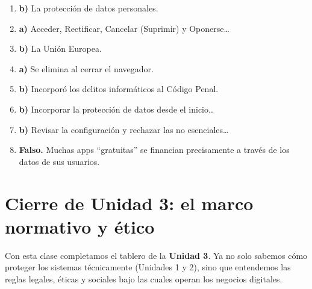 \documentclass[12pt,a4paper]{article}
\newcommand{\checkMark}{\ding{51}}
\begin{document}
\vspace{12pt}
\begin{tcolorbox}[colback=verdeOK!10, colframe=verdeOK,
                  title={\checkMark \; Clave de respuestas}, arc=3mm]
\begin{enumerate}[leftmargin=2em]
  \item \textbf{b)} La protecci\'on de datos personales.
  \item \textbf{a)} Acceder, Rectificar, Cancelar (Suprimir) y Oponerse\ldots
  \item \textbf{b)} La Uni\'on Europea.
  \item \textbf{a)} Se elimina al cerrar el navegador.
  \item \textbf{b)} Incorpor\'o los delitos inform\'aticos al C\'odigo Penal.
  \item \textbf{b)} Incorporar la protecci\'on de datos desde el inicio\ldots
  \item \textbf{b)} Revisar la configuraci\'on y rechazar las no esenciales\ldots
  \item \textbf{Falso.} Muchas apps ``gratuitas'' se financian precisamente a trav\'es de los datos de sus usuarios.
\end{enumerate}
\end{tcolorbox}

\newpage
\section{Cierre de Unidad 3: el marco normativo y \'etico}

Con esta clase completamos el tablero de la \textbf{Unidad 3}. Ya no solo sabemos c\'omo proteger los sistemas t\'ecnicamente (Unidades 1 y 2), sino que entendemos las reglas legales, \'eticas y sociales bajo las cuales operan los negocios digitales.
\end{document}
